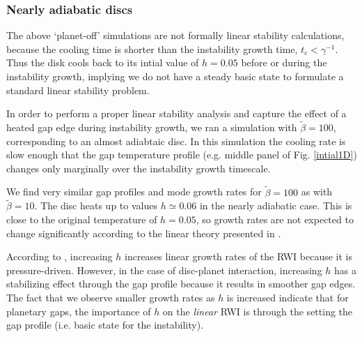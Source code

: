 \subsubsection{Nearly adiabatic discs}
\label{adiabatic_section}
The above `planet-off' simulations are not formally linear
stability calculations, because the cooling time is shorter
than the instability growth time, 
%
$t_c<\gamma^{-1}$.  
Thus the disk cools back to its intial value of $h=0.05$
before or during the instability growth, implying we do not have a
steady basic state to formulate a standard linear stability
problem. %

In order to perform a proper linear stability analysis and capture the
effect of a heated gap edge during instability growth, we ran a simulation  with
$\tilde{\beta}=100$, corresponding to an almost adiabtaic disc.  
In this simulation the cooling rate is slow enough that the gap 
temperature profile (e.g. middle panel of Fig. \ref{intial1D}) changes
only marginally over the instability growth timescale. %

We find very similar gap profiles and mode growth rates for
$\tilde{\beta}=100$ as with $\tilde{\beta}=10$. The disc heats up to
values $h\simeq0.06$ in the nearly adiabatic case. This is close to
the original temperature of $h=0.05$, so growth rates are not expected
to change significantly according to the linear theory presented in
\citep{li00}. 

According to \cite{li00}, increasing $h$ increases linear growth rates
of the RWI because it is pressure-driven. However, in the case 
of disc-planet interaction, increasing $h$ has a stabilizing effect
through the gap profile because it results in smoother gap
edges. The fact that we observe smaller growth rates as $h$ is
increased indicate that for planetary gaps, the importance of $h$ on
the \emph{linear} RWI is through the setting the gap profile (i.e. basic
state for the instability). 



